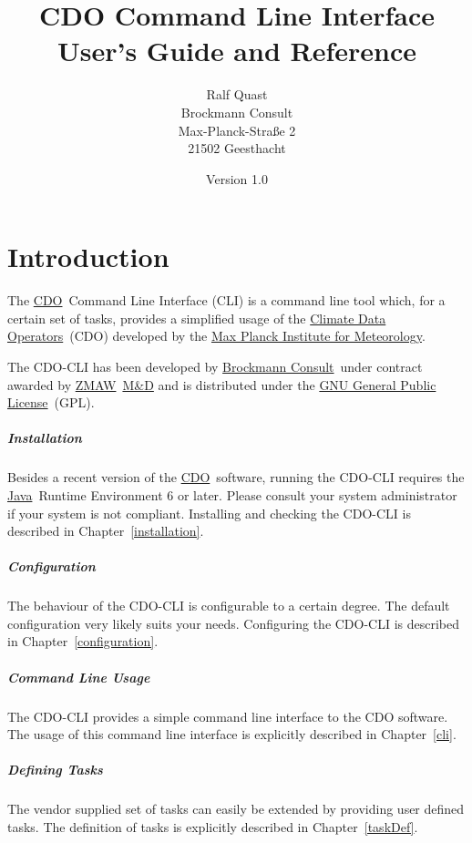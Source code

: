 \documentclass[
square
,pdftex
]{refrep}
\title{CDO Command Line Interface User's Guide and Reference}
\author{Ralf Quast\\
  Brockmann Consult\\
  Max-Planck-Stra\ss e 2\\
  21502 Geesthacht}
\date{Version 1.0}
\newcommand{\bc}{\href{http://www.brockmann-consult.de/}
    {Brockmann Consult}}
\newcommand{\cdo}{\href{http://www.mpimet.mpg.de/cdo/}{CDO}}
\newcommand{\cdolong}{\href{http://www.mpimet.mpg.de/cdo/}
    {Climate Data Operators}}
\newcommand{\gpl}{\href{http://www.gnu.org/licenses/gpl-3.0.html}
    {GNU General Public License}}
\newcommand{\java}{\href{http://java.sun.com/}{Java}}
\newcommand{\mpimet}{\href{http://www.mpimet.mpg.de/}
    {Max Planck Institute for Meteorology}}
\newcommand{\zmaw}{\href{http://www.zmaw.de/}{ZMAW}}
\begin{document}
\begin{fullpage}
\maketitle
\end{fullpage}

\tableofcontents
\newpage

\chapter{Introduction}

The \cdo\ Command Line Interface (CLI) is a command line tool which, for a
certain set of tasks, provides a simplified usage of the \cdolong\ (CDO)
developed by the \mpimet.

The CDO-CLI has been developed by \bc\ under contract awarded by
\zmaw\ \href{http://www.mad.zmaw.de/}{M\&D} and is distributed under
the \gpl\ (GPL).

\paragraph{Installation}
Besides a recent version of the \cdo\ software, running the CDO-CLI requires
the \java\ Runtime Environment 6 or later. Please consult your system
administrator if your system is not compliant. Installing and checking the
CDO-CLI is described in Chapter~\ref{installation}.

\paragraph{Configuration}
The behaviour of the CDO-CLI is configurable to a certain degree. The default
configuration very likely suits your needs. Configuring the CDO-CLI is described
in Chapter~\ref{configuration}.

\paragraph{Command Line Usage}
The CDO-CLI provides a simple command line interface to the CDO software. The
usage of this command line interface is explicitly described in
Chapter~\ref{cli}.

\paragraph{Defining Tasks}
The vendor supplied set of tasks can easily be extended by providing user
defined tasks. The definition of tasks is explicitly described in
Chapter~\ref{taskDef}.
\end{document}
